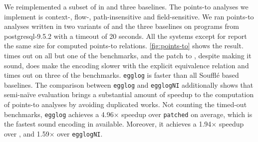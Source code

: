 We reimplemented a subset of \cclyzerpp in \egglog and three baselines. 
The points-to analyses we implement is context-, flow-, path-insensitive and field-sensitive.
We ran points-to analyses written 
 in two variants of \egglog and the three baselines 
 on programs from postgresql-9.5.2 with a timeout of 20 seconds.
All the systems except for \cclyzerpp 
 report the same size for computed points-to relations.
\autoref{fig:points-to} shows the result.
\eqrel times out on all but one of the benchmarks, 
 and the patch to \cclyzerpp, despite making it sound,
 does make the encoding slower with the explicit equivalence relation
 and times out on three of the benchmarks.
\texttt{egglog} is faster than all Souffl\'e based baselines.
The comparison between \texttt{egglog} and \texttt{egglogNI}
 additionally shows that semi-na\"ive evaluation brings a substantial amount of 
 speedup to the computation of points-to analyses 
 by avoiding duplicated works.
Not counting the timed-out benchmarks, 
 \texttt{egglog} achieves a 4.96$\times$ speedup over \texttt{patched} on average,
 which is the fastest sound encoding in \souffle available.
Moreover, it achieves a 1.94$\times$ speedup over \cclyzerpp, 
 and 1.59$\times$ over \texttt{egglogNI}.

